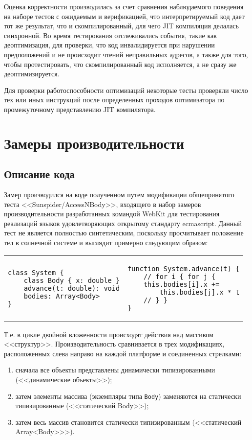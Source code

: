 \documentclass[times
,titlepage
]{itmo-student-thesis}
\begin{document}
Оценка корректности производилась за счет сравнения наблюдаемого поведения на наборе тестов с ожидаемым и верификацией, что интерпретируемый код дает тот же результат, что и скомпилированный, для чего JIT компиляция делалась синхронной. Во время тестирования отслеживались события, такие как деоптимизация, для проверки, что код инвалидируется при нарушении предположений и не происходит чтений неправильных адресов, а также для того, чтобы протестировать, что скомпилированный код исполняется, а не сразу же деоптимизируется.

Для проверки работоспособности оптимизаций некоторые тесты проверяли число тех или иных инструкций после определенных проходов оптимизатора по промежуточному представлению JIT компилятора.

\section{Замеры производительности}\label{sec:sunspider}
\subsection{Описание кода}
Замер производился на коде полученном путем модификации общепринятого теста <<Sunspider/AccessNBody>>, входящего в набор замеров производительности разработанных командой WebKit для тестирования реализаций языков удовлетворяющих открытому стандарту ecmascript. Данный тест не является полностью синтетическим, поскольку просчитывает положение тел в солнечной системе и выглядит примерно следующим образом:

\begin{center}
\begin{tabular}[t]{p{}|p{}}
\begin{lstlisting}
class System {
	class Body { x: double }
	advance(t: double): void
	bodies: Array<Body>
}
\end{lstlisting} &
\begin{lstlisting}
function System.advance(t) {
	// for i { for j {
	this.bodies[i].x +=
		this.bodies[j].x * t
	// } }
}
\end{lstlisting}
\end{tabular}
\end{center}

Т.е. в цикле двойной вложенности происходят действия над массивом <<структур>>. Производительность сравнивается в трех модификациях, расположенных слева направо на каждой платформе и соединенных стрелками:
\begin{enumerate}
	\item сначала все объекты представлены динамически типизированными (<<динамические объекты>>);
	\item затем элементы массива (экземпляры типа \texttt{Body}) заменяются на статически типизированные (<<статический Body>>);
	\item затем весь массив становится статически типизированным (<<статический Array<Body>>>).
\end{enumerate}
\end{document}
